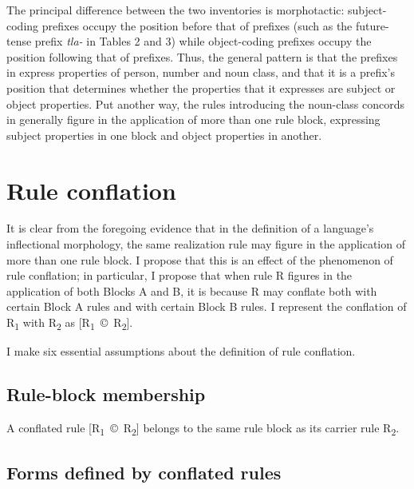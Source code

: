 \documentclass[output=paper,
modfonts
]{LSP/langsci}
\begin{document}
The principal difference between the two inventories is morphotactic:  subject-coding prefixes occupy the position before that of  prefixes (such as the future-tense prefix \textit{tla\nobreakdash-} in Tables 2 and 3) while object-coding prefixes occupy the position following that of  prefixes.  Thus, the general pattern is that the prefixes in  express properties of person, number and noun class, and that it is a prefix’s position that determines whether the properties that it expresses are subject or object properties.  Put another way, the rules introducing the noun-class concords in  generally figure in the application of more than one rule block, expressing subject properties in one block and object properties in another.

\section{Rule conflation}\label{sec:stump:4}
\largerpage[-1]
It is clear from the foregoing evidence that in the definition of a language’s inflectional morphology, the same realization rule may figure in the application of more than one rule block.  I propose that this is an effect of the phenomenon of rule conflation; in particular, I propose that when rule R figures in the application of both Blocks A and B, it is because R may conflate both with certain Block A rules and with certain Block B rules.  I represent the conflation of R\textsubscript{1} with R\textsubscript{2} as [R\textsubscript{1}~©~R\textsubscript{2}].

I make six essential assumptions about the definition of rule conflation.  

 \subsection{Rule-block membership} 

A conflated rule [R\textsubscript{1}~©~R\textsubscript{2}] belongs to the same rule block as its carrier rule R\textsubscript{2}.  

 \subsection{Forms defined by conflated rules}
\end{document}
